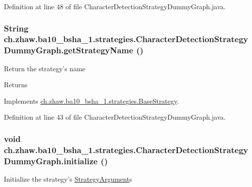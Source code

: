 Definition at line 48 of file CharacterDetectionStrategyDummyGraph.java.\hypertarget{classch_1_1zhaw_1_1ba10__bsha__1_1_1strategies_1_1CharacterDetectionStrategyDummyGraph_a8daf8f26a2d43d7b8e8e7be71e1edae5}{
\subsubsection[{getStrategyName}]{\setlength{\rightskip}{0pt plus 5cm}String ch.zhaw.ba10\_\-bsha\_\-1.strategies.CharacterDetectionStrategyDummyGraph.getStrategyName ()}}
\label{classch_1_1zhaw_1_1ba10__bsha__1_1_1strategies_1_1CharacterDetectionStrategyDummyGraph_a8daf8f26a2d43d7b8e8e7be71e1edae5}
Return the strategy's name

\begin{DoxyReturn}{Returns}

\end{DoxyReturn}


Implements \hyperlink{classch_1_1zhaw_1_1ba10__bsha__1_1_1strategies_1_1BaseStrategy_aa0ebed55eed45409bad13d43a0058780}{ch.zhaw.ba10\_\-bsha\_\-1.strategies.BaseStrategy}.

Definition at line 43 of file CharacterDetectionStrategyDummyGraph.java.\hypertarget{classch_1_1zhaw_1_1ba10__bsha__1_1_1strategies_1_1CharacterDetectionStrategyDummyGraph_a5e2ad376333d4f59481d0600fec019f0}{
\subsubsection[{initialize}]{\setlength{\rightskip}{0pt plus 5cm}void ch.zhaw.ba10\_\-bsha\_\-1.strategies.CharacterDetectionStrategyDummyGraph.initialize ()}}
\label{classch_1_1zhaw_1_1ba10__bsha__1_1_1strategies_1_1CharacterDetectionStrategyDummyGraph_a5e2ad376333d4f59481d0600fec019f0}
Initialize the strategy's \hyperlink{classch_1_1zhaw_1_1ba10__bsha__1_1_1StrategyArgument}{StrategyArgument}s 

